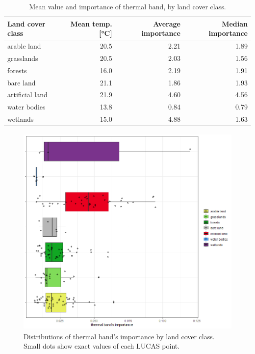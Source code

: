 \documentclass{amuthesis}
\begin{document}
\hypertarget{tbl-tabela6}{}
\begin{table}
\caption{\label{tbl-tabela6}Mean value and importance of thermal band, by land cover class. }\tabularnewline

\centering
\begin{tabular}{|>{}l|>{}r|>{}r|>{}r|}
\toprule
\textbf{Land cover class} & \textbf{Mean temp. [°C]} & \textbf{Average importance} & \textbf{Median importance}\\
\midrule
arable land & 20.5 & 2.21 & 1.89\\
\hline
grasslands & 20.5 & 2.03 & 1.56\\
\hline
forests & 16.0 & 2.19 & 1.91\\
\hline
bare land & 21.1 & 1.86 & 1.93\\
\hline
artificial land & 21.9 & 4.60 & 4.56\\
\hline
water bodies & 13.8 & 0.84 & 0.79\\
\hline
wetlands & 15.0 & 4.88 & 1.63\\
\bottomrule
\end{tabular}
\end{table}

\begin{figure}[H]

{\centering \includegraphics[width=4.45833in,height=4.16667in]{./figures/importance_classes.png}

}

\caption{\label{fig-rycina14}Distributions of thermal band's importance
by land cover class. Small dots show exact values of each LUCAS point.}

\end{figure}
\end{document}
